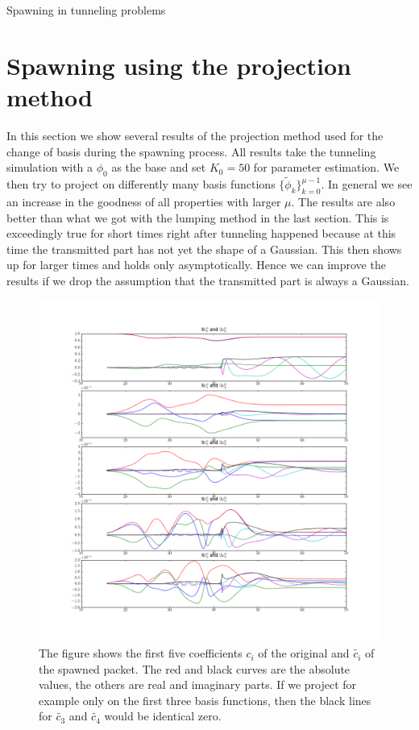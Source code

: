 \begin{chapter}{Spawning in tunneling problems}
\FloatBarrier
\section{Spawning using the projection method}

In this section we show several results of the projection method used for the change
of basis during the spawning process. All results take the tunneling simulation with
a $\phi_0$ as the base and set $K_0 = 50$ for parameter estimation. We then try to
project on differently many basis functions $\{\tilde{\phi}_k\}_{k=0}^{\mu-1}$. In
general we see an increase in the goodness of all properties with larger $\mu$. The
results are also better than what we got with the lumping method in the last section.
This is exceedingly true for short times right after tunneling happened because
at this time the transmitted part has not yet the shape of a Gaussian. This then
shows up for larger times and holds only asymptotically. Hence we can improve the results
if we drop the assumption that the transmitted part is always a Gaussian.


\begin{figure}[h!]
  \centering
  \includegraphics[width=\the\linewidth]{./figures/eckart_phi0_spawn_project_K50_bs6/wavepacket_coefficients_spawn_first.png}
  \caption[The first five coefficients $c_i$ of the original and $\tilde{c_i}$ of the spawned packet]
  {The figure shows the first five coefficients $c_i$ of the original and $\tilde{c_i}$ of the spawned packet.
  The red and black curves are the absolute values, the others are real and imaginary parts. If we project for example
  only on the first three basis functions, then the black lines for $\tilde{c_3}$ and $\tilde{c_4}$ would be
  identical zero.}
\end{figure}



\end{chapter}
